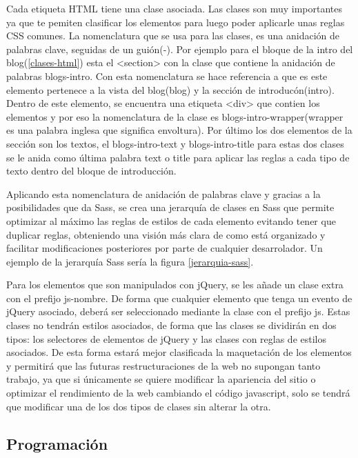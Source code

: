 Cada etiqueta HTML tiene una clase asociada. Las clases son muy importantes ya que te pemiten clasificar los elementos para luego poder aplicarle unas reglas CSS comunes. La nomenclatura que se usa para las clases, es una anidación de palabras clave, seguidas de un guión(-). Por ejemplo para el bloque de la intro del blog(\ref{clases-html}) esta el <section> con la clase que contiene la anidación de palabras blogs-intro. Con esta nomenclatura se hace referencia a que es este elemento pertenece a la vista del blog(blog) y la sección de introducón(intro). Dentro de este elemento, se encuentra una etiqueta <div> que contien los elementos y por eso la nomenclatura de la clase es blogs-intro-wrapper(wrapper es una palabra inglesa que significa envoltura). Por último los dos elementos de la sección son los textos, el blogs-intro-text y blogs-intro-title para estas dos clases se le anida como última palabra text o title para aplicar las reglas a cada tipo de texto dentro del bloque de introducción.

\vspace{5 mm}

Aplicando esta nomenclatura de anidación de palabras clave y gracias a la posibilidades que da Sass, se crea una jerarquía de clases en Sass que permite optimizar al máximo las reglas de estilos de cada elemento evitando tener que duplicar reglas, obteniendo una visión más clara de como está organizado y facilitar modificaciones posteriores por parte de cualquier desarrolador. Un ejemplo de la jerarquía Sass sería la figura \ref{jerarquia-sass}.


\vspace{5 mm}

Para los elementos que son manipulados con jQuery, se les añade un clase extra con el prefijo js-nombre. De forma que cualquier elemento que tenga un evento de jQuery asociado, deberá ser seleccionado mediante la clase con el prefijo js. Estas clases no tendrán estilos asociados, de forma que las clases se dividirán en dos tipos: los selectores de elementos de jQuery y las clases con reglas de estilos asociados. De esta forma estará mejor clasificada la maquetación de los elementos y permitirá que las futuras restructuraciones de la web no supongan tanto trabajo, ya que si únicamente se quiere modificar la apariencia del sitio o optimizar el rendimiento de la web cambiando el código javascript, solo se tendrá que modificar una de los dos tipos de clases sin alterar la otra.


\subsection{Programación}

